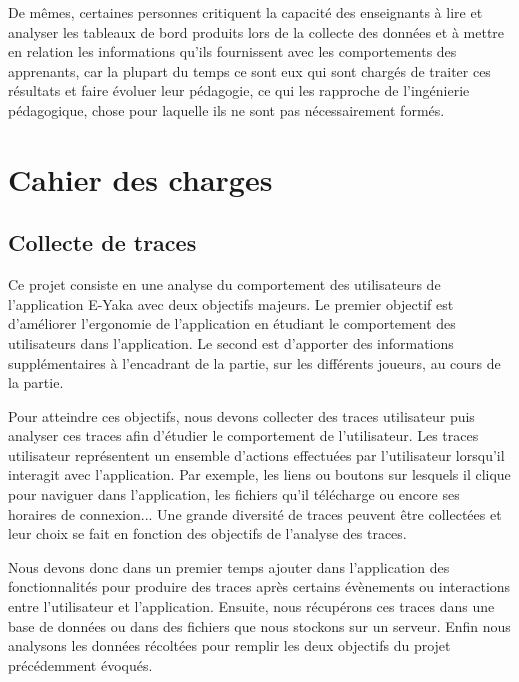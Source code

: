             De mêmes, certaines personnes critiquent la capacité des enseignants à lire et analyser les tableaux de bord produits lors de la collecte des données et à mettre en relation les informations qu’ils fournissent avec les comportements des apprenants, car la plupart du temps ce sont eux qui sont chargés de traiter ces résultats et faire évoluer leur pédagogie, ce qui les rapproche de l’ingénierie pédagogique, chose pour laquelle ils ne sont pas nécessairement formés.
        
       


    \section{Cahier des charges  }

        \subsection{Collecte de traces}

            
            Ce projet consiste en une analyse du comportement des utilisateurs de l’application E-Yaka avec deux objectifs majeurs. Le premier objectif est d’améliorer l’ergonomie de l’application en étudiant le comportement des utilisateurs dans l’application. Le second est d’apporter des informations supplémentaires à l’encadrant de la partie, sur les différents joueurs, au cours de la partie.
            
            Pour atteindre ces objectifs, nous devons collecter des traces utilisateur puis analyser ces traces afin d’étudier le comportement de l’utilisateur. Les traces utilisateur représentent un ensemble d’actions effectuées par l’utilisateur lorsqu’il interagit avec l’application. Par exemple, les liens ou boutons sur lesquels il clique pour naviguer dans l’application, les fichiers qu’il télécharge ou encore ses horaires de connexion... Une grande diversité de traces peuvent être collectées et leur choix se fait en fonction des objectifs de l’analyse des traces.
            
            Nous devons donc dans un premier temps ajouter dans l’application des fonctionnalités pour produire des traces après certains évènements ou interactions entre l’utilisateur et l’application. Ensuite, nous récupérons ces traces dans une base de données ou dans des fichiers que nous stockons sur un serveur. Enfin nous analysons les données récoltées pour remplir les deux objectifs du projet précédemment évoqués.
            
